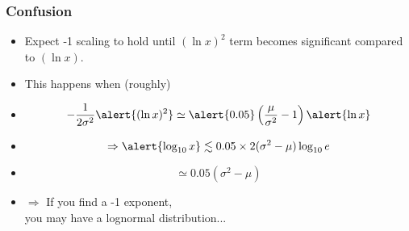 \begin{frame}
  \frametitle{Confusion}

  \begin{block}{}
  \begin{itemize}
  \item<1->   Expect -1 scaling to hold until $(\ln{x})^2$ term 
    becomes significant compared to $(\ln{x})$.
  \item<2->   This happens when (roughly)
  \item<3-> $$
    -\frac{1}
    {2\sigma^2}
    \alert{  (\ln x)^2}
    \simeq
    \alert{0.05}
    \left(
      \frac{\mu}{\sigma^2} - 1
    \right)
    \alert{\ln x  }
    $$
  \item<4->
    $$
    \Rightarrow
    \alert{\log_{10} x}
    \lesssim
    0.05\times2(\sigma^2 - \mu) 
    \log_{10} e
    $$
  \item<5->
    $$
    \simeq 0.05 (\sigma^2 - \mu) 
    $$
  \item<6->
    $\Rightarrow$ If you find a -1 exponent,\\
    \qquad you may have a lognormal distribution...
  \end{itemize}
  \end{block}

\end{frame}


